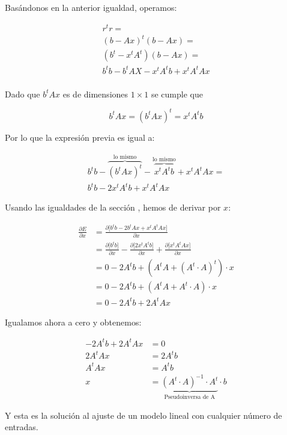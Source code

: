 \documentclass[11pt]{scrartcl}
\begin{document}
Basándonos en la anterior igualdad, operamos:

\begin{gather*}
r^t  r = \\
(b - A  x)^t  (b - A  x) = \\
(b^t - x^t  A^t)  (b - A  x) = \\
b^t  b - b^t  A  X - x^t  A^t  b + x^t  A^t  A  x  \\
\end{gather*}

Dado que $b^t Ax$ es de dimensiones $1 \times 1$ se cumple que

$$
b^t Ax = (b^t Ax)^t = x^t A^t b
$$

Por lo que la expresión previa es igual a:

\begin{gather*}
b^tb - 
\overbrace{(b^t A x)^t}^\text{lo mismo} - 
\overbrace{x^t A^t b}^\text{lo mismo} + x^t A^t A x = \\
b^tb -
2 x^t A^t b +
x^t A^t A x
\end{gather*}

Usando las igualdades de la sección \textit{},
hemos de derivar por $x$:

\begin{align*}
\frac{\partial E}{\partial x} & = \frac{\partial \Big[ b^tb - 2 b^t A x + x^t A^t A x \Big]}{\partial x}\\
& = \frac{\partial \Big[ b^t b\Big]}{\partial x} - \frac{\partial \Big[ 2x^t A^t b \Big]}{\partial x} + \frac{\partial \Big[ x^t A^t A x \Big]}{\partial x} \\
& = 0 - 2 A^t b + (A^t A + (A^t \cdot A)^t) \cdot x \\
& = 0 - 2 A^t b + (A^t A + A^t \cdot A) \cdot x \\
& = 0 - 2 A^t b + 2 A^t A x
\end{align*}

Igualamos ahora a cero y obtenemos:

\begin{align*}
- 2 A^t b + 2 A^t A x &= 0 \\
2 A^t A x &= 2 A^t b \\
  A^t A x &= A^t b \\
x &= \underbrace{(A^t \cdot A) ^{-1} \cdot A^t}_\text{Pseudoinversa de A} \cdot b
\end{align*}

Y esta es la solución al ajuste de un modelo lineal con cualquier número de entradas.
\end{document}
